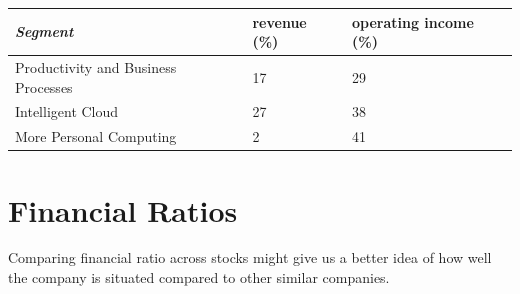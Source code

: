 \documentclass[]{article}
\begin{document}
	\begin{table}[]
		\begin{tabular}{|l|l|l|}
			\hline
			\textit{\textbf{Segment}} & \textbf{revenue (\%)} & \textbf{operating income (\%)} \\ \hline
			Productivity and Business Processes & 17 & 29 \\ \hline
			Intelligent Cloud & 27 & 38 \\ \hline
			More Personal Computing & 2 & 41 \\ \hline
		\end{tabular}
	\end{table}
	
	
	\section{Financial Ratios}
	Comparing financial ratio across stocks might give us a better idea of how well the company is situated compared to other similar companies.
	
\end{document}

